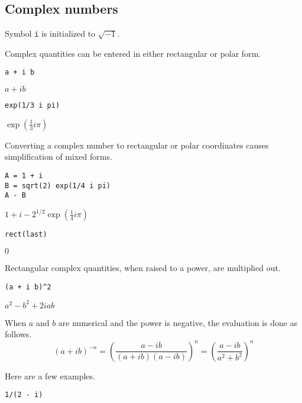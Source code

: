 \subsection{Complex numbers}

Symbol \verb$i$ is initialized to $\sqrt{-1}$.

\bigskip
\noindent
Complex quantities can be entered in either rectangular or polar form.

{\color{blue}
\begin{verbatim}
a + i b
\end{verbatim}
}

\noindent
$a+ib$

{\color{blue}
\begin{verbatim}
exp(1/3 i pi)
\end{verbatim}
}

\noindent
$\exp\left(\tfrac{1}{3}i\pi\right)$

\bigskip
\noindent
Converting a complex number to rectangular or polar coordinates causes
simplification of mixed forms.

{\color{blue}
\begin{verbatim}
A = 1 + i
B = sqrt(2) exp(1/4 i pi)
A - B
\end{verbatim}
}

\noindent
$1+i-2^{1/2}\exp\left(\tfrac{1}{4}i\pi\right)$

{\color{blue}
\begin{verbatim}
rect(last)
\end{verbatim}
}

\noindent
$0$

\bigskip
\noindent
Rectangular complex quantities, when raised to a power, are multiplied out.

{\color{blue}
\begin{verbatim}
(a + i b)^2
\end{verbatim}
}

\noindent
$a^2-b^2+2iab$

\bigskip
\noindent
When $a$ and $b$ are numerical and the power is negative, the evaluation is done as follows.
\begin{equation*}
(a+ib)^{-n}
=\left(\frac{a-ib}{(a+ib)(a-ib)}\right)^n=
\left(\frac{a-ib}{a^2+b^2}\right)^n
\end{equation*}

\noindent
Here are a few examples.

{\color{blue}
\begin{verbatim}
1/(2 - i)
\end{verbatim}
}

